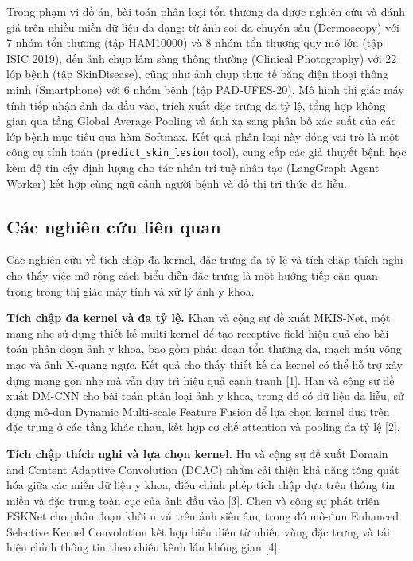 Trong phạm vi đồ án, bài toán phân loại tổn thương da được nghiên cứu và đánh giá trên nhiều miền dữ liệu đa dạng: từ ảnh soi da chuyên sâu (Dermoscopy) với 7 nhóm tổn thương (tập HAM10000) và 8 nhóm tổn thương quy mô lớn (tập ISIC 2019), đến ảnh chụp lâm sàng thông thường (Clinical Photography) với 22 lớp bệnh (tập SkinDisease), cũng như ảnh chụp thực tế bằng điện thoại thông minh (Smartphone) với 6 nhóm bệnh (tập PAD-UFES-20). Mô hình thị giác máy tính tiếp nhận ảnh da đầu vào, trích xuất đặc trưng đa tỷ lệ, tổng hợp không gian qua tầng Global Average Pooling và ánh xạ sang phân bố xác suất của các lớp bệnh mục tiêu qua hàm Softmax. Kết quả phân loại này đóng vai trò là một công cụ tính toán (\texttt{predict\_skin\_lesion} tool), cung cấp các giả thuyết bệnh học kèm độ tin cậy định lượng cho tác nhân trí tuệ nhân tạo (LangGraph Agent Worker) kết hợp cùng ngữ cảnh người bệnh và đồ thị tri thức da liễu.

\subsection{Các nghiên cứu liên quan}

Các nghiên cứu về tích chập đa kernel, đặc trưng đa tỷ lệ và tích chập thích nghi cho thấy việc mở rộng cách biểu diễn đặc trưng là một hướng tiếp cận quan trọng trong thị giác máy tính và xử lý ảnh y khoa.

\textbf{Tích chập đa kernel và đa tỷ lệ.} Khan và cộng sự đề xuất MKIS-Net, một mạng nhẹ sử dụng thiết kế multi-kernel để tạo receptive field hiệu quả cho bài toán phân đoạn ảnh y khoa, bao gồm phân đoạn tổn thương da, mạch máu võng mạc và ảnh X-quang ngực. Kết quả cho thấy thiết kế đa kernel có thể hỗ trợ xây dựng mạng gọn nhẹ mà vẫn duy trì hiệu quả cạnh tranh [1]. Han và cộng sự đề xuất DM-CNN cho bài toán phân loại ảnh y khoa, trong đó có dữ liệu da liễu, sử dụng mô-đun Dynamic Multi-scale Feature Fusion để lựa chọn kernel dựa trên đặc trưng ở các tầng khác nhau, kết hợp cơ chế attention và pooling đa tỷ lệ [2].

\textbf{Tích chập thích nghi và lựa chọn kernel.} Hu và cộng sự đề xuất Domain and Content Adaptive Convolution (DCAC) nhằm cải thiện khả năng tổng quát hóa giữa các miền dữ liệu y khoa, điều chỉnh phép tích chập dựa trên thông tin miền và đặc trưng toàn cục của ảnh đầu vào [3]. Chen và cộng sự phát triển ESKNet cho phân đoạn khối u vú trên ảnh siêu âm, trong đó mô-đun Enhanced Selective Kernel Convolution kết hợp biểu diễn từ nhiều vùng đặc trưng và tái hiệu chỉnh thông tin theo chiều kênh lẫn không gian [4].

